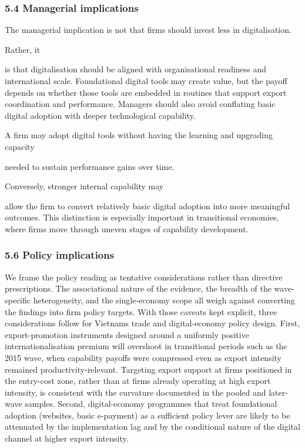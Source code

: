 \documentclass[12pt,a4paper]{article}
\begin{document}
\hypertarget{54-managerial-implications}{%
\subsubsection{5.4 Managerial
implications}\label{54-managerial-implications}}

The managerial implication is not that firms should invest less in
digitalisation.

Rather, it

is that digitalisation should be aligned with organisational readiness
and international scale. Foundational digital tools may create value,
but the payoff depends on whether those tools are embedded in routines
that support export coordination and performance. Managers should also
avoid conflating basic digital adoption with deeper technological
capability.

A firm may adopt digital tools without having the learning and upgrading
capacity

needed to sustain performance gains over time.

Conversely, stronger internal capability may

allow the firm to convert relatively basic digital adoption into more
meaningful outcomes. This distinction is especially important in
transitional economies, where firms move through uneven stages of
capability development.

\hypertarget{56-policy-implications}{%
\subsubsection{5.6 Policy implications}\label{56-policy-implications}}

We frame the policy reading as tentative considerations rather than
directive prescriptions. The associational nature of the evidence, the
breadth of the wave-specific heterogeneity, and the single-economy scope
all weigh against converting the findings into firm policy targets. With
those caveats kept explicit, three considerations follow for
Vietnam\textquotesingle s trade and digital-economy policy design.
First, export-promotion instruments designed around a uniformly positive
internationalisation premium will overshoot in transitional periods such
as the 2015 wave, when capability payoffs were compressed even as export
intensity remained productivity-relevant. Targeting export support at
firms positioned in the entry-cost zone, rather than at firms already
operating at high export intensity, is consistent with the curvature
documented in the pooled and later-wave samples. Second, digital-economy
programmes that treat foundational adoption (websites, basic e-payment)
as a sufficient policy lever are likely to be attenuated by the
implementation lag and by the conditional nature of the digital channel
at higher export intensity.
\end{document}
